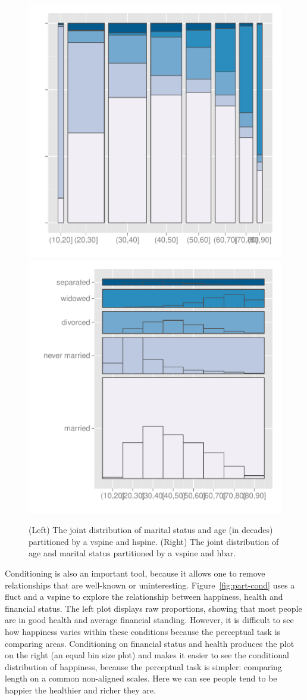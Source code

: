 \documentclass[letterpaper,oneside]{scrartcl}
\begin{document}
\begin{figure}[htbp]
  \centering
    \includegraphics[width=0.5\linewidth]{part-marital-1}%
    \includegraphics[width=0.5\linewidth]{part-marital-2}
  \caption{(Left) The joint distribution of marital status and age (in decades) partitioned by a vspine and hspine.  (Right) The joint distribution of age and marital status partitioned by a vspine and hbar.}
  \label{fig:marital}
\end{figure}

Conditioning is also an important tool, because it allows one to remove relationships that are well-known or uninteresting. Figure~\ref{fig:part-cond} uses a fluct and a vspine to explore the relationship between happiness, health and financial status. The left plot displays raw proportions, showing that most people are in good health and average financial standing. However, it is difficult to see how happiness varies within these conditions because the perceptual task is comparing areas. Conditioning on financial status and health produces the plot on the right (an equal bin size plot) and makes it easier to see the conditional distribution of happiness, because the perceptual task is simpler: comparing length on a common non-aligned scales.  Here we can see people tend to be happier the healthier and richer they are.
\end{document}
